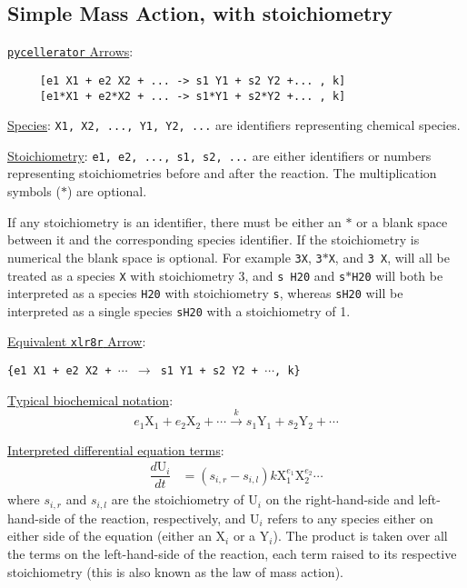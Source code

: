 \subsection{Simple Mass Action, with stoichiometry}
\label{section:simple-mass-action-stoich}


\underline{{\tt pycellerator} Arrows}: \begin{lstlisting}
     [e1 X1 + e2 X2 + ... -> s1 Y1 + s2 Y2 +... , k] 
     [e1*X1 + e2*X2 + ... -> s1*Y1 + s2*Y2 +... , k]
\end{lstlisting} 

\underline{Species}: {\tt X1, X2, ...,  Y1, Y2, ...} are identifiers representing chemical species.

\underline{Stoichiometry}: {\tt e1, e2, ..., s1, s2, ...} are either identifiers or numbers representing stoichiometries before and after the reaction. The multiplication symbols ($*$) are optional. 

If any stoichiometry is an identifier, there must be either an $*$ or a blank space between it and the corresponding species identifier. If the stoichiometry is numerical the blank space is optional. For example {\tt 3X}, {\tt 3$*$X}, and {\tt 3\ X}, will all be treated as a species {\tt X} with stoichiometry 3, and  {\tt s H20} and {\tt s$*$H20} will both be interpreted as a species {\tt H20} with stoichiometry {\tt s}, whereas {\tt sH20} will be interpreted as a single species {\tt sH20} with a stoichiometry of 1. 


\underline{Equivalent {\tt xlr8r} Arrow}: \begin{center}
{\tt \{e1 X1 + e2 X2 + $\cdots$  $\to$ s1 Y1 + s2 Y2 + $\cdots$, k\}}
\end{center}

\underline{Typical biochemical notation}: $$e_1 \text{X}_1 + e_2 \text{X}_2 + \cdots \overset{k}{\to} s_1\text{Y}_1 + s_2\text{Y}_2 + \cdots$$

\underline{Interpreted differential equation terms}: 
\begin{align*}
\dfrac{d\text{U}_i}{dt} &=
(s_{i,r}-s_{i,l}) k \text{X}_1^{e_1} \text{X}_2^{e_2} \cdots
\end{align*}
where $s_{i,r}$ and $s_{i,l}$ are the stoichiometry of $\text{U}_i$ on the right-hand-side and left-hand-side of the reaction, respectively, and $\text{U}_i$ refers to any species either on either side of the equation (either an $\text{X}_i$ or a $\text{Y}_i$). The product is taken over all the terms on the left-hand-side of the reaction, each term raised to its respective stoichiometry (this is also known as the law of mass action).  



